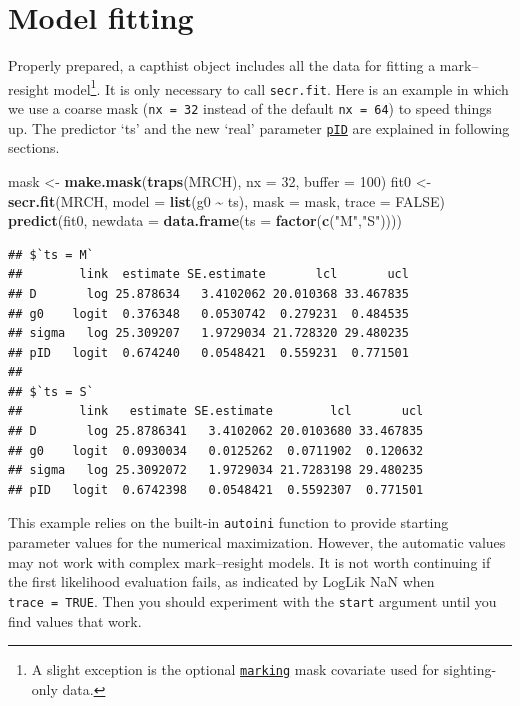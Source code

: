 \documentclass[
]{book}
\newenvironment{Shaded}{\begin{snugshade}}{\end{snugshade}}
\newcommand{\AttributeTok}[1]{\textcolor[rgb]{0.13,0.29,0.53}{#1}}
\newcommand{\ConstantTok}[1]{\textcolor[rgb]{0.56,0.35,0.01}{#1}}
\newcommand{\DecValTok}[1]{\textcolor[rgb]{0.00,0.00,0.81}{#1}}
\newcommand{\FunctionTok}[1]{\textcolor[rgb]{0.13,0.29,0.53}{\textbf{#1}}}
\newcommand{\NormalTok}[1]{#1}
\newcommand{\OtherTok}[1]{\textcolor[rgb]{0.56,0.35,0.01}{#1}}
\newcommand{\SpecialCharTok}[1]{\textcolor[rgb]{0.81,0.36,0.00}{\textbf{#1}}}
\newcommand{\StringTok}[1]{\textcolor[rgb]{0.31,0.60,0.02}{#1}}
\begin{document}
\section{Model fitting}\label{model-fitting-1}

Properly prepared, a capthist object includes all the data for fitting a mark--resight model\footnote{A slight exception is the optional \hyperref[areaspecification]{\texttt{marking}} mask covariate used for sighting-only data.}. It is only necessary to call \texttt{secr.fit}. Here is an example in which we use a coarse mask (\texttt{nx\ =\ 32} instead of the default \texttt{nx\ =\ 64}) to speed things up. The predictor `ts' and the new `real' parameter \hyperref[pID]{\texttt{pID}} are explained in following sections.

\begin{Shaded}
\begin{Highlighting}[]
\NormalTok{mask }\OtherTok{\textless{}{-}} \FunctionTok{make.mask}\NormalTok{(}\FunctionTok{traps}\NormalTok{(MRCH), }\AttributeTok{nx =} \DecValTok{32}\NormalTok{, }\AttributeTok{buffer =} \DecValTok{100}\NormalTok{)}
\NormalTok{fit0 }\OtherTok{\textless{}{-}} \FunctionTok{secr.fit}\NormalTok{(MRCH, }\AttributeTok{model =} \FunctionTok{list}\NormalTok{(g0 }\SpecialCharTok{\textasciitilde{}}\NormalTok{ ts), }\AttributeTok{mask =}\NormalTok{ mask, }\AttributeTok{trace =} \ConstantTok{FALSE}\NormalTok{)}
\FunctionTok{predict}\NormalTok{(fit0, }\AttributeTok{newdata =} \FunctionTok{data.frame}\NormalTok{(}\AttributeTok{ts =} \FunctionTok{factor}\NormalTok{(}\FunctionTok{c}\NormalTok{(}\StringTok{"M"}\NormalTok{,}\StringTok{"S"}\NormalTok{))))}
\end{Highlighting}
\end{Shaded}

\begin{verbatim}
## $`ts = M`
##        link  estimate SE.estimate       lcl       ucl
## D       log 25.878634   3.4102062 20.010368 33.467835
## g0    logit  0.376348   0.0530742  0.279231  0.484535
## sigma   log 25.309207   1.9729034 21.728320 29.480235
## pID   logit  0.674240   0.0548421  0.559231  0.771501
## 
## $`ts = S`
##        link   estimate SE.estimate        lcl       ucl
## D       log 25.8786341   3.4102062 20.0103680 33.467835
## g0    logit  0.0930034   0.0125262  0.0711902  0.120632
## sigma   log 25.3092072   1.9729034 21.7283198 29.480235
## pID   logit  0.6742398   0.0548421  0.5592307  0.771501
\end{verbatim}

This example relies on the built-in \texttt{autoini} function to provide starting parameter values for the numerical maximization. However, the automatic values may not work with complex mark--resight models. It is not worth continuing if the first likelihood evaluation fails, as indicated by LogLik NaN when \texttt{trace\ =\ TRUE}. Then you should experiment with the \texttt{start} argument until you find values that work.
\end{document}
